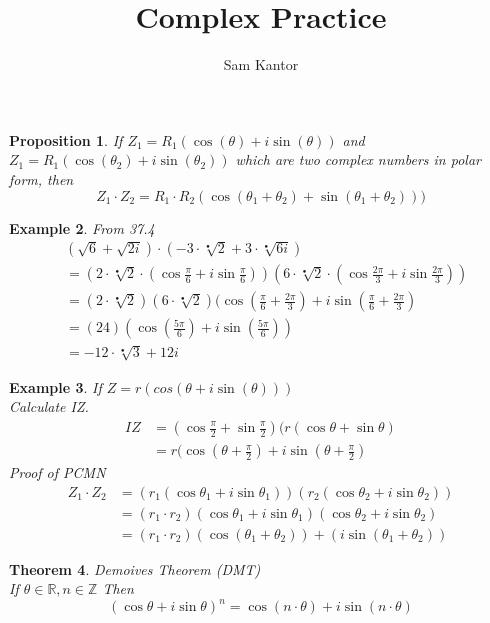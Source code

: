 \documentclass[English, 12pt]{article}
\title{Complex Practice}
\author{Sam Kantor}
\newtheorem{theorem}{Theorem}[section]
\newtheorem{proposition}[theorem]{Proposition}
\newtheorem{example}[theorem]{Example}
\begin{document}
\maketitle
\setcounter{section}{38}
\begin{proposition}
If $Z_1 = R_1(\cos (\theta) + i\sin(\theta))$ and $Z_1 = R_1(\cos (\theta_2) + i\sin(\theta_2))$ which are two complex numbers in polar form, then $$Z_1 \cdot Z_2 = R_1 \cdot R_2 (\cos(\theta_1 + \theta_2) + \sin(\theta_1 + \theta_2)))$$
\end{proposition}

\begin{example}
From 37.4
\begin{align*}
 & (\sqrt{6} + \sqrt{2i}) \cdot (-3\cdot\sqrt[•]{2} + 3\cdot\sqrt[•]{6i}) \\
 &=(2\cdot\sqrt[•]{2}\cdot(\cos \frac{\pi}{6} + i\sin \frac{\pi}{6}))(6\cdot\sqrt[•]{2}\cdot(\cos \frac{2\pi}{3} + i\sin \frac{2\pi}{3})) \\
 &= (2\cdot \sqrt[•]{2}) (6\cdot \sqrt[•]{2})(\cos (\frac{\pi}{6} + \frac{2\pi}{3}) + i\sin (\frac{\pi}{6} + \frac{2 \pi}{3}) \\
 &= (24)(\cos (\frac{5\pi}{6}) + i\sin (\frac{5\pi}{6})) \\
 &= -12\cdot \sqrt[•]{3} + 12i   
\end{align*}
\end{example}

\begin{example} 
If $Z = r(cos(\theta + i\sin(\theta)))$	 \\
Calculate IZ. 
\begin{align*}
IZ &= (\cos\frac{\pi}{2} + \sin\frac{\pi}{2}) (r (\cos\theta + \sin\theta) \\
   &= r(\cos(\theta + \frac{\pi}{2}) + i\sin(\theta + \frac{\pi}{2})
\end{align*}
\newpage
\Large{Proof of PCMN}
\begin{align*}
Z_1 \cdot Z_2 &= (r_1 (\cos \theta_1 + i\sin \theta_1)) (r_2 (\cos \theta_2 + i\sin \theta_2)) \\
&= (r_1\cdot r_2) (\cos \theta_1 + i\sin\theta_1) (\cos\theta_2 + i\sin\theta_2)\\
&= (r_1 \cdot r_2) (\cos (\theta_1 + \theta_2)) + (i\sin (\theta_1 + \theta_2))
\end{align*}

\end{example}
\begin{theorem} Demoives Theorem (DMT) \\
If $\theta \in \mathbb{R}, n \in \mathbb{Z}$ Then 
\begin{equation*}
(\cos\theta + i\sin\theta)^n = \cos (n\cdot\theta) + i\sin(n\cdot \theta)
\end{equation*}
\end{theorem}
\end{document}
